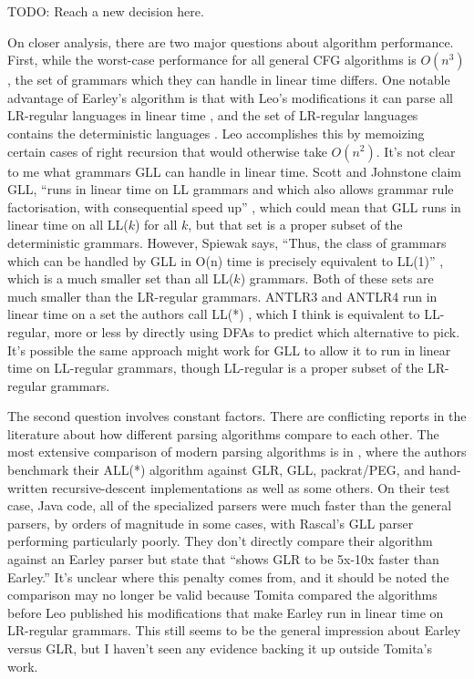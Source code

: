\documentclass[12pt]{article}
\begin{document}
TODO: Reach a new decision here.

On closer analysis, there are two major questions about algorithm
performance.  First, while the worst-case performance for all general
CFG algorithms is $O(n^3)$, the set of grammars which they can handle
in linear time differs.  One notable advantage of Earley's algorithm
is that with Leo's modifications it can parse all LR-regular languages
in linear time \parencites{leo, marpa}, and the set of LR-regular
languages contains the deterministic languages \parencite{lr-regular}.
Leo accomplishes this by memoizing certain cases of right recursion
that would otherwise take $O(n^2)$.  It's not clear to me what
grammars GLL can handle in linear time.  Scott and Johnstone claim
GLL, ``runs in linear time on LL grammars and which also allows
grammar rule factorisation, with consequential speed
up'' \parencite{gll1}, which could mean that GLL runs in linear time
on all LL($k$) for all $k$, but that set is a proper subset of the
deterministic grammars.  However, Spiewak says, ``Thus, the class of
grammars which can be handled by GLL in O(n) time is precisely
equivalent to LL(1)'' \parencite{spiewak}, which is a much smaller set
than all LL($k$) grammars.  Both of these sets are much smaller than
the LR-regular grammars.  ANTLR3 and ANTLR4 run in linear time on a
set the authors call LL(*) \parencites{antlr3, antlr4}, which I think
is equivalent to LL-regular, more or less by directly using DFAs to
predict which alternative to pick.  It's possible the same approach
might work for GLL to allow it to run in linear time on LL-regular
grammars, though LL-regular is a proper subset of the LR-regular
grammars\parencite{ll-regular}.

The second question involves constant factors.  There are conflicting
reports in the literature about how different parsing algorithms
compare to each other.  The most extensive comparison of modern
parsing algorithms is in \textcite{antlr4}, where the authors
benchmark their ALL(*) algorithm against GLR, GLL, packrat/PEG, and
hand-written recursive-descent implementations as well as some others.
On their test case, Java code, all of the specialized parsers were
much faster than the general parsers, by orders of magnitude in some
cases, with Rascal's GLL parser performing particularly poorly.  They
don't directly compare their algorithm against an Earley parser but
state that \textcite{tomita1985efficient} ``shows GLR to be 5x-10x
faster than Earley.''  It's unclear where this penalty comes from, and
it should be noted the comparison may no longer be valid because
Tomita compared the algorithms before Leo published his modifications
that make Earley run in linear time on LR-regular grammars.  This
still seems to be the general impression about Earley versus GLR, but
I haven't seen any evidence backing it up outside Tomita's work.
\end{document}
